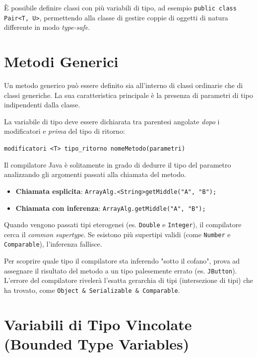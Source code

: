 È possibile definire classi con più variabili di tipo, ad esempio \texttt{public class Pair<T, U>}, permettendo alla classe di gestire coppie di oggetti di natura differente in modo \textit{type-safe}.

\section{Metodi Generici}

Un metodo generico può essere definito sia all'interno di classi ordinarie che di classi generiche. La sua caratteristica principale è la presenza di parametri di tipo indipendenti dalla classe.

La variabile di tipo deve essere dichiarata tra parentesi angolate \textit{dopo} i modificatori e \textit{prima} del tipo di ritorno:
\begin{center}
\texttt{modificatori <T> tipo\_ritorno nomeMetodo(parametri)}
\end{center}

Il compilatore Java è solitamente in grado di dedurre il tipo del parametro analizzando gli argomenti passati alla chiamata del metodo.
\begin{itemize}
    \item \textbf{Chiamata esplicita}: \texttt{ArrayAlg.<String>getMiddle("A", "B");}
    \item \textbf{Chiamata con inferenza}: \texttt{ArrayAlg.getMiddle("A", "B");}
\end{itemize}

\medskip

Quando vengono passati tipi eterogenei (es. \texttt{Double} e \texttt{Integer}), il compilatore cerca il \textit{common supertype}. Se esistono più supertipi validi (come \texttt{Number} e \texttt{Comparable}), l'inferenza fallisce.

\begin{tip}
Per scoprire quale tipo il compilatore sta inferendo "sotto il cofano", prova ad assegnare il risultato del metodo a un tipo palesemente errato (es. \texttt{JButton}). L'errore del compilatore rivelerà l'esatta gerarchia di tipi (intersezione di tipi) che ha trovato, come \texttt{Object \& Serializable \& Comparable}.
\end{tip}

\section{Variabili di Tipo Vincolate (Bounded Type Variables)}

